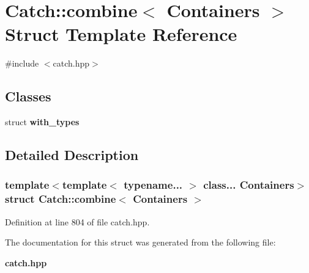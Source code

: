 \section{Catch\+::combine$<$ Containers $>$ Struct Template Reference}
\label{struct_catch_1_1combine}


{\ttfamily \#include $<$catch.\+hpp$>$}

\subsection*{Classes}
\begin{DoxyCompactItemize}
\item 
struct \textbf{ with\+\_\+types}
\end{DoxyCompactItemize}


\subsection{Detailed Description}
\subsubsection*{template$<$template$<$ typename... $>$ class... Containers$>$\newline
struct Catch\+::combine$<$ Containers $>$}



Definition at line 804 of file catch.\+hpp.



The documentation for this struct was generated from the following file\+:\begin{DoxyCompactItemize}
\item 
\textbf{ catch.\+hpp}\end{DoxyCompactItemize}
